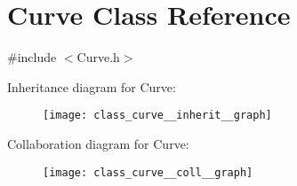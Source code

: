 \hypertarget{class_curve}{}\section{Curve Class Reference}
\label{class_curve}


{\ttfamily \#include $<$Curve.\+h$>$}



Inheritance diagram for Curve\+:
\nopagebreak
\begin{figure}[H]
\begin{center}
\leavevmode
\texttt{[image: class\_curve\_\_inherit\_\_graph]}
\end{center}
\end{figure}


Collaboration diagram for Curve\+:
\nopagebreak
\begin{figure}[H]
\begin{center}
\leavevmode
\texttt{[image: class\_curve\_\_coll\_\_graph]}
\end{center}
\end{figure}
